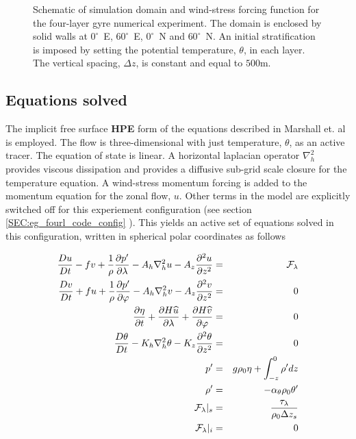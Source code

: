 \begin{figure}
\begin{center}
\end{center}
\caption{Schematic of simulation domain and wind-stress forcing function 
for the four-layer gyre numerical experiment. The domain is enclosed by solid
walls at $0^{\circ}$~E, $60^{\circ}$~E, $0^{\circ}$~N and $60^{\circ}$~N.
An initial stratification is 
imposed by setting the potential temperature, $\theta$, in each layer.
The vertical spacing, $\Delta z$, is constant and equal to $500$m.
}
\label{FIG:simulation_config}
\end{figure}

\subsection{Equations solved}

The implicit free surface {\bf HPE} form of the 
equations described in Marshall et. al \cite{Marshall97a} is 
employed. The flow is three-dimensional with just temperature, $\theta$, as 
an active tracer.  The equation of state is linear.
A horizontal laplacian operator $\nabla_{h}^2$ provides viscous
dissipation and provides a diffusive sub-grid scale closure for the 
temperature equation. A wind-stress momentum forcing is added to the momentum 
equation for the zonal flow, $u$. Other terms in the model
are explicitly switched off for this experiement configuration (see section
\ref{SEC:eg_fourl_code_config} ). This yields an active set of equations
solved in this configuration, written in spherical polar coordinates as 
follows

\begin{eqnarray}
\label{EQ:model_equations}
\frac{Du}{Dt} - fv + 
  \frac{1}{\rho}\frac{\partial p^{\prime}}{\partial \lambda} - 
  A_{h}\nabla_{h}^2u - A_{z}\frac{\partial^{2}u}{\partial z^{2}} 
& = &
\cal{F}_{\lambda}
\\
\frac{Dv}{Dt} + fu + 
  \frac{1}{\rho}\frac{\partial p^{\prime}}{\partial \varphi} - 
  A_{h}\nabla_{h}^2v - A_{z}\frac{\partial^{2}v}{\partial z^{2}} 
& = &
0
\\
\frac{\partial \eta}{\partial t} + \frac{\partial H \widehat{u}}{\partial \lambda} +
\frac{\partial H \widehat{v}}{\partial \varphi}
&=&
0
\label{eq:fourl_example_continuity}
\\
\frac{D\theta}{Dt} -
 K_{h}\nabla_{h}^2\theta  - K_{z}\frac{\partial^{2}\theta}{\partial z^{2}} 
& = &
0
\label{eq:eg_fourl_theta}
\\
p^{\prime} & = &
g\rho_{0} \eta + \int^{0}_{-z}\rho^{\prime} dz
\\
\rho^{\prime} & = &- \alpha_{\theta}\rho_{0}\theta^{\prime}
\\
{\cal F}_{\lambda} |_{s} & = & \frac{\tau_{\lambda}}{\rho_{0}\Delta z_{s}}
\\
{\cal F}_{\lambda} |_{i} & = & 0
\end{eqnarray}

